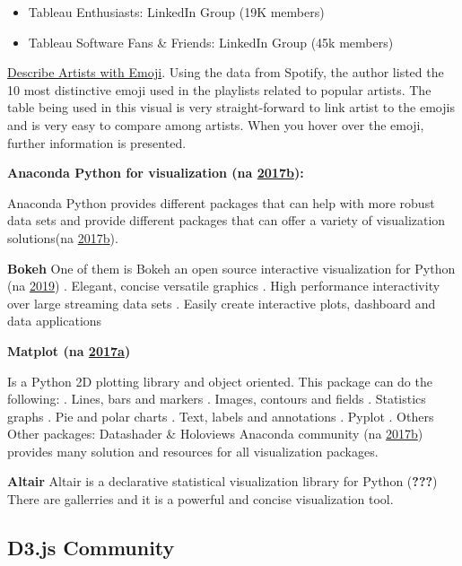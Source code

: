 \documentclass[]{book}
\providecommand{\tightlist}{%
  \setlength{\itemsep}{0pt}\setlength{\parskip}{0pt}}
\begin{document}
\begin{itemize}
\tightlist
\item
  Tableau Enthusiasts: LinkedIn Group (19K members)
\item
  Tableau Software Fans \& Friends: LinkedIn Group (45k members)
\end{itemize}

\href{https://public.tableau.com/en-us/s/gallery/what-emoji-say-about-music?gallery=featured}{Describe Artists with Emoji}. Using the data from Spotify, the author listed the 10 most distinctive emoji used in the playlists related to popular artists. The table being used in this visual is very straight-forward to link artist to the emojis and is very easy to compare among artists. When you hover over the emoji, further information is presented.

\textbf{Anaconda Python for visualization (na \protect\hyperlink{ref-Python2019}{2017}\protect\hyperlink{ref-Python2019}{b}):}

Anaconda Python provides different packages that can help with more robust data sets and provide different packages that can offer a variety of visualization solutions(na \protect\hyperlink{ref-Python2019}{2017}\protect\hyperlink{ref-Python2019}{b}).

\textbf{Bokeh}
One of them is Bokeh an open source interactive visualization for Python (na \protect\hyperlink{ref-Bokeh}{2019})
. Elegant, concise versatile graphics
. High performance interactivity over large streaming data sets
. Easily create interactive plots, dashboard and data applications

\textbf{Matplot (na \protect\hyperlink{ref-Matplot}{2017}\protect\hyperlink{ref-Matplot}{a})}

Is a Python 2D plotting library and object oriented.
This package can do the following:
. Lines, bars and markers
. Images, contours and fields
. Statistics graphs
. Pie and polar charts
. Text, labels and annotations
. Pyplot
. Others
Other packages: Datashader \& Holoviews
Anaconda community (na \protect\hyperlink{ref-Python2019}{2017}\protect\hyperlink{ref-Python2019}{b}) provides many solution and resources for all visualization packages.

\textbf{Altair}
Altair is a declarative statistical visualization library for Python ({\textbf{???}})
There are gallerries and it is a powerful and concise visualization tool.

\hypertarget{d3.js-community}{%
\subsection{D3.js Community}\label{d3.js-community}}
\end{document}
